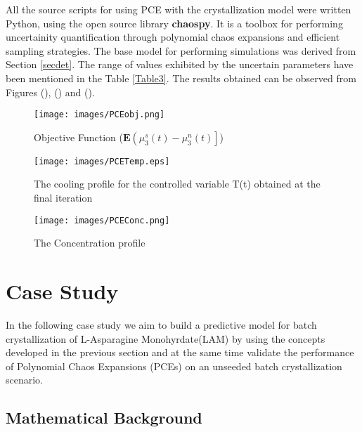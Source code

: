 \documentclass[3p,times,authoryear]{elsarticle}
\begin{document}
All the source scripts for using PCE with the crystallization model were written Python, using the open source library \textbf{chaospy}\cite{chaospy}. It is a toolbox for performing uncertainity quantification through polynomial chaos expansions and efficient sampling strategies. The base model for performing simulations was derived from Section \ref{secdet}. The range of values exhibited by the uncertain parameters have been mentioned in the Table \ref{Table3}. The results obtained can be observed from Figures (\label{PCEObj}), (\label{PCETemp}) and (\label{PCEConc}).



\begin{figure}[h!] 
\begin{center}
\texttt{[image: images/PCEobj.png]} 
\end{center}
\caption{Objective Function ($\mathbf{E}\left(\mu_{3}^{s}(t) - \mu_{3}^{n}(t)\right]$)} \label{PCEObj}
\end{figure}


\begin{figure}[h!] 
\begin{center} 
\texttt{[image: images/PCETemp.eps]} 
\end{center}
\caption{The cooling profile for the controlled variable T(t) obtained at the final iteration} 
\end{figure}

\begin{figure}[h!] 

\begin{center}
\texttt{[image: images/PCEConc.png]} 
\end{center}
\caption{The Concentration profile} \label{PCEConc}
\end{figure}

\section{Case Study}

In the following case study we aim to build a predictive model for batch crystallization of L-Asparagine Monohyrdate(LAM) by using the concepts developed in the previous section and at the same time validate the performance of Polynomial Chaos Expansions (PCEs) on an unseeded batch crystallization scenario.   

\subsection{Mathematical Background}
\end{document}
